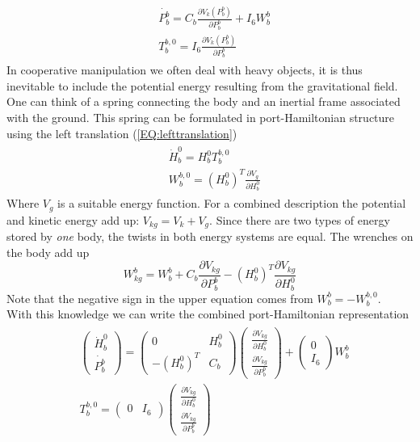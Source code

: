 \documentclass[a4paper,twoside, openright,12pt]{report}
\begin{document}
\begin{eqnarray}\label{EQ:PHSsimpleinertia}
\begin{aligned}
	&\dot{P_b^b} = C_b \frac{\partial V_k(P_b^b)}{\partial P_b^b} + I_6 W_{b}^b \\
	&T_b^{b,0} = I_6 \frac{\partial V_k(P_b^b)}{\partial P_b^b}
\end{aligned}
\end{eqnarray}
In cooperative manipulation we often deal with heavy objects, it is thus inevitable to include the potential energy resulting from the gravitational field. One can think of a spring connecting the body and an inertial frame associated with the ground. This spring can be formulated in port-Hamiltonian structure using the left translation (\ref{EQ:lefttranslation})
\begin{eqnarray}\label{EQ:gravityspring}
\begin{aligned}
	&\dot{H}_b^0 = H_b^0 T_b^{b,0}\\
	&W_b^{b,0} = (H_b^0)^T\frac{\partial V_{g}}{\partial H_b^0}
\end{aligned}
\end{eqnarray}
Where $V_g$ is a suitable energy function. For a combined description the potential and kinetic energy add up: $V_{kg} = V_k + V_g$. Since there are two types of energy stored by \emph{one} body, the twists in both energy systems are equal. The wrenches on the body add up   
\[W_{kg}^b = W_{b}^b + C_b \frac{\partial V_{kg}}{\partial P_b^b} - (H_b^0)^T \frac{\partial V_{kg}}{\partial H_b^0} \]
Note that the negative sign in the upper equation comes from $W_b^b = - W_b^{b,0} $.\\
With this knowledge we can write the combined port-Hamiltonian representation
\begin{eqnarray} \label{EQ:PHSinertia}
\begin{aligned}
&\begin{pmatrix}\dot{H}_b^0 \\ \dot{P_b^b}\end{pmatrix} =
\begin{pmatrix} 0 & H_b^0  \\
- (H_b^0)^T & C_b\end{pmatrix}
\begin{pmatrix}\frac{\partial V_{kg}}{\partial H_b^0} \\ \frac{\partial V_{kg}}{\partial P_b^b}\end{pmatrix}+
\begin{pmatrix}0 \\ I_6\end{pmatrix} W_{b}^b \\
&T_b^{b,0} = \begin{pmatrix}0 & I_6\end{pmatrix}
\begin{pmatrix}\frac{\partial V_{kg}}{\partial H_b^0} \\ \frac{\partial V_{kg}}{\partial P_b^b}\end{pmatrix}
\end{aligned}
\end{eqnarray}
\end{document}
